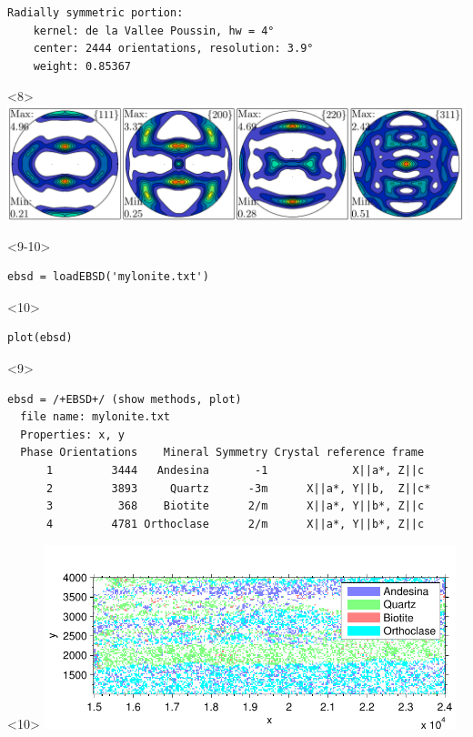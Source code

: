 \documentclass[comptress]{beamer}
\begin{document}
\begin{frame}[fragile]
\begin{overlayarea}{\textwidth}{5.5cm}
\begin{onlyenv}
\begin{lstlisting}[style=output]
  Radially symmetric portion:
    kernel: de la Vallee Poussin, hw = 4°
    center: 2444 orientations, resolution: 3.9°
    weight: 0.85367
  \end{lstlisting}
\end{onlyenv}
\begin{onlyenv}<8>
  \includegraphics[width=\textwidth]{pic/pdf}
\end{onlyenv}
\begin{onlyenv}<9-10>
  \begin{lstlisting}[style=input]
ebsd = loadEBSD('mylonite.txt')
  \end{lstlisting}
\end{onlyenv}
\begin{onlyenv}<10>
  \vspace{-0.3cm}
  \begin{lstlisting}[style=input]
plot(ebsd)
  \end{lstlisting}
\end{onlyenv}
\begin{onlyenv}<9>
  \begin{lstlisting}[style=output]
ebsd = /+EBSD+/ (show methods, plot)
  file name: mylonite.txt
  Properties: x, y
  Phase Orientations    Mineral Symmetry Crystal reference frame
      1         3444   Andesina       -1             X||a*, Z||c
      2         3893     Quartz      -3m      X||a*, Y||b,  Z||c*
      3          368    Biotite      2/m      X||a*, Y||b*, Z||c
      4         4781 Orthoclase      2/m      X||a*, Y||b*, Z||c
  \end{lstlisting}
\end{onlyenv}
\begin{onlyenv}<10>
  \vspace{-0.75cm}
  \includegraphics[width=0.9\textwidth]{pic/ebsdmylonite}

\end{onlyenv}
\end{overlayarea}
\end{frame}
\end{document}
